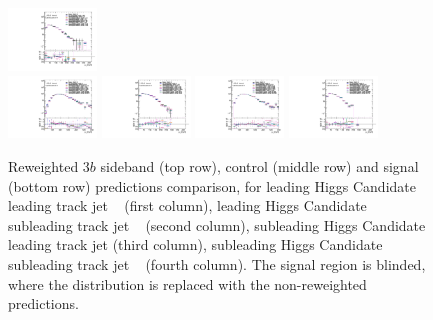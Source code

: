\begin{figure}[htbp!]
\begin{center}
\includegraphics[width=0.21\textwidth,angle=-90]{figures/boosted/AppendixReweight/Compare/Data_ThreeTag_Control_directcompare_sublHCand_trk1_Pt_1.pdf}\\
\includegraphics[width=0.21\textwidth,angle=-90]{figures/boosted/AppendixReweight/Compare/Data_ThreeTag_Signal_directcompare_leadHCand_trk0_Pt_1.pdf}
\includegraphics[width=0.21\textwidth,angle=-90]{figures/boosted/AppendixReweight/Compare/Data_ThreeTag_Signal_directcompare_leadHCand_trk1_Pt_1.pdf}
\includegraphics[width=0.21\textwidth,angle=-90]{figures/boosted/AppendixReweight/Compare/Data_ThreeTag_Signal_directcompare_sublHCand_trk0_Pt_1.pdf}
\includegraphics[width=0.21\textwidth,angle=-90]{figures/boosted/AppendixReweight/Compare/Data_ThreeTag_Signal_directcompare_sublHCand_trk1_Pt_1.pdf}\\
\caption{Reweighted $3b$ sideband (top row), control (middle row) and signal (bottom row) predictions comparison, for leading Higgs Candidate leading track jet \pt~ (first column),  leading Higgs Candidate subleading track jet \pt~ (second column), subleading Higgs Candidate leading track jet \pt (third column), subleading Higgs Candidate subleading track jet \pt~ (fourth column). The signal region is blinded, where the distribution is replaced with the non-reweighted predictions.}
\label{fig:app-rw-comp-3b-trkjet}
\end{center}
\end{figure}

